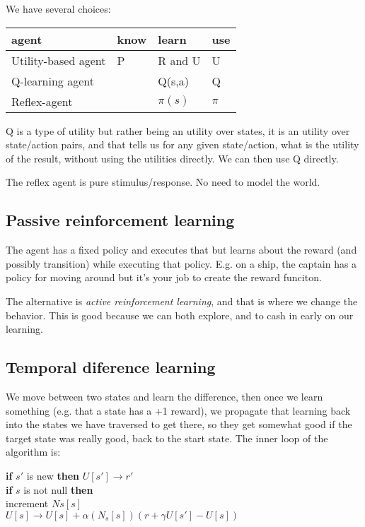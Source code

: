 \documentclass[a4, 12pt, english, USenglish]{scrreprt}
\newcommand{\idx}[1]{{\em #1}\index{#1}}
\begin{document}
We have several choices:

\begin{tabular}{llll}
{\bf agent}&{\bf know}&{\bf learn}&{\bf use} \\ \hline
Utility-based agent& P& R and U&  U \\
Q-learning agent&& Q(s,a)&Q \\
Reflex-agent & & \(\pi(s)\)&\(\pi\)\\
\end{tabular}

Q is a type of utility but rather being an utility over states, it is
an utility over state/action pairs, and that tells us for any given
state/action, what is the utility of the result, without using the
utilities directly. We can then use Q directly.

The reflex agent is pure stimulus/response.  No need to model the
world.

\subsection{Passive reinforcement learning}

The agent has a fixed policy and executes that but learns about the
reward (and possibly transition) while executing that policy. E.g. on
a ship, the captain has a policy for moving around but it's your job
to create the reward funciton.

The alternative is \idx{active reinforcement learning}, and that is where we
change the behavior.  This is good because we can both explore, and to
cash in early on our learning.

\subsection{Temporal diference learning}

We move between two states and learn the difference, then once we
learn something (e.g. that a state has a +1 reward), we  propagate
that learning back into the states we have traversed to get there, so
they get somewhat good if the target state was really good, back to
the start state.  The inner loop of the algorithm is:

\begin{tabbing}
{\bf if}  \=\(s'\) is new {\bf then} \(U[s']\rightarrow r'\) \\
{\bf if} \> \(s\) is not null {\bf then} \\
      \> increment \(Ns[s]\) \\
      \> \(U[s]\rightarrow U[s] + \alpha(N_s[s]) (r  + \gamma  U[s'] - U[s])\)
\end{tabbing}
\end{document}
